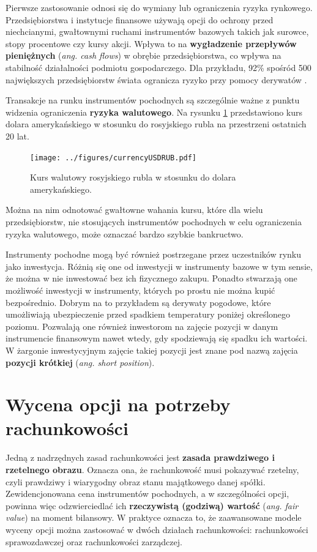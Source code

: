 \documentclass{pracamgr}
\begin{document}
Pierwsze zastosowanie odnosi się do wymiany lub ograniczenia ryzyka rynkowego. Przedsiębiorstwa i 
instytucje finansowe używają opcji do 
ochrony przed niechcianymi, gwałtownymi ruchami instrumentów bazowych takich jak surowce, stopy 
procentowe czy kursy akcji. Wpływa to na 
\textbf{wygładzenie przepływów pieniężnych} (\textit{ang. cash flows}) w obrębie przedsiębiorstwa, co 
wpływa na stabilność działalności 
podmiotu gospodarczego. Dla przykładu, 92\% spośród 500 największych przedsiębiorstw świata ogranicza 
ryzyko przy pomocy derywatów  \cite{GlobalDerMarket}.


Transakcje na runku instrumentów pochodnych są szczególnie ważne z punktu widzenia 
ograniczenia \textbf{ryzyka walutowego}. Na rysunku \ref{fig:currencyRisk} przedstawiono kurs dolara 
amerykańskiego w stosunku do rosyjskiego rubla na przestrzeni ostatnich 20 lat.

\begin{figure}
  \centering  
  \texttt{[image: ../figures/currencyUSDRUB.pdf]}
  \caption{Kurs walutowy rosyjskiego rubla w stosunku do dolara amerykańskiego.}\label{fig:currencyRisk}
\end{figure} 
Można na nim odnotować gwałtowne wahania kursu, które dla wielu przedsiębiorstw, nie stosujących 
instrumentów pochodnych w celu ograniczenia ryzyka walutowego, może oznaczać bardzo szybkie 
bankructwo. 
 
Instrumenty pochodne mogą być również postrzegane przez uczestników rynku jako inwestycja. 
Różnią się one od inwestycji w instrumenty bazowe w tym sensie, że można w nie inwestować bez ich 
fizycznego zakupu.
Ponadto stwarzają one możliwość inwestycji w instrumenty, których po prostu nie można kupić 
bezpośrednio. Dobrym na to przykładem są derywaty pogodowe, które umożliwiają ubezpieczenie przed 
spadkiem temperatury poniżej określonego poziomu.
Pozwalają one również inwestorom na zajęcie pozycji w danym instrumencie finansowym nawet wtedy, gdy 
spodziewają się spadku ich wartości. W żargonie inwestycyjnym zajęcie takiej pozycji jest znane pod 
nazwą zajęcia \textbf{pozycji krótkiej} (\textit{ang. short position}).


\section{Wycena opcji na potrzeby rachunkowości}
\label{sec:aspekty_finansowe}

Jedną z nadrzędnych zasad rachunkowości jest \textbf{zasada prawdziwego i rzetelnego obrazu}. Oznacza 
ona, że rachunkowość musi pokazywać rzetelny, czyli prawdziwy i wiarygodny
obraz stanu majątkowego danej spółki. Zewidencjonowana cena instrumentów pochodnych, a w 
szczególności opcji, powinna więc odzwierciedlać ich \textbf{rzeczywistą 
(godziwą) wartość} (\textit{ang. fair value}) na moment bilansowy. W praktyce oznacza to, że 
zaawansowane modele wyceny opcji można zastosować w dwóch działach rachunkowości: rachunkowości 
sprawozdawczej oraz rachunkowości zarządczej.
\end{document}
